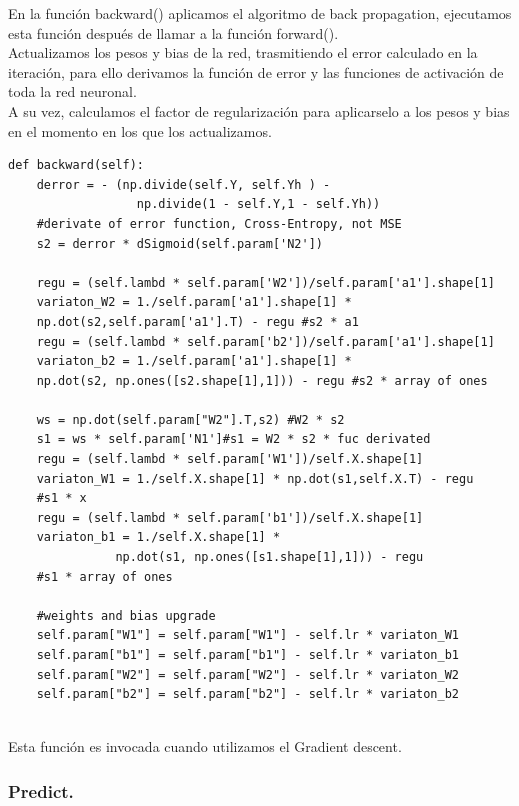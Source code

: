 \documentclass[a4paper,10pt]{article}
\begin{document}
En la función backward() aplicamos el algoritmo de back propagation, ejecutamos esta función después de llamar a la función forward(). \\Actualizamos los pesos y bias de la red, trasmitiendo el error calculado en la iteración, para ello derivamos la función de error y las funciones de activación de toda la red neuronal. \\A su vez, calculamos el factor de regularización para aplicarselo a los pesos y bias en el momento en los que los actualizamos.
\begin{lstlisting}
def backward(self):
    derror = - (np.divide(self.Y, self.Yh ) - 
                  np.divide(1 - self.Y,1 - self.Yh))
    #derivate of error function, Cross-Entropy, not MSE
    s2 = derror * dSigmoid(self.param['N2']) 

    regu = (self.lambd * self.param['W2'])/self.param['a1'].shape[1]
    variaton_W2 = 1./self.param['a1'].shape[1] *
    np.dot(s2,self.param['a1'].T) - regu #s2 * a1
    regu = (self.lambd * self.param['b2'])/self.param['a1'].shape[1]
    variaton_b2 = 1./self.param['a1'].shape[1] * 
    np.dot(s2, np.ones([s2.shape[1],1])) - regu #s2 * array of ones

    ws = np.dot(self.param["W2"].T,s2) #W2 * s2                    
    s1 = ws * self.param['N1']#s1 = W2 * s2 * fuc derivated      
    regu = (self.lambd * self.param['W1'])/self.X.shape[1]
    variaton_W1 = 1./self.X.shape[1] * np.dot(s1,self.X.T) - regu
    #s1 * x
    regu = (self.lambd * self.param['b1'])/self.X.shape[1]
    variaton_b1 = 1./self.X.shape[1] * 
               np.dot(s1, np.ones([s1.shape[1],1])) - regu 
    #s1 * array of ones 
    
    #weights and bias upgrade
    self.param["W1"] = self.param["W1"] - self.lr * variaton_W1 
    self.param["b1"] = self.param["b1"] - self.lr * variaton_b1 
    self.param["W2"] = self.param["W2"] - self.lr * variaton_W2 
    self.param["b2"] = self.param["b2"] - self.lr * variaton_b2
        
\end{lstlisting}
Esta función es invocada cuando utilizamos el Gradient descent.
\subsubsection{Predict.}
\end{document}
